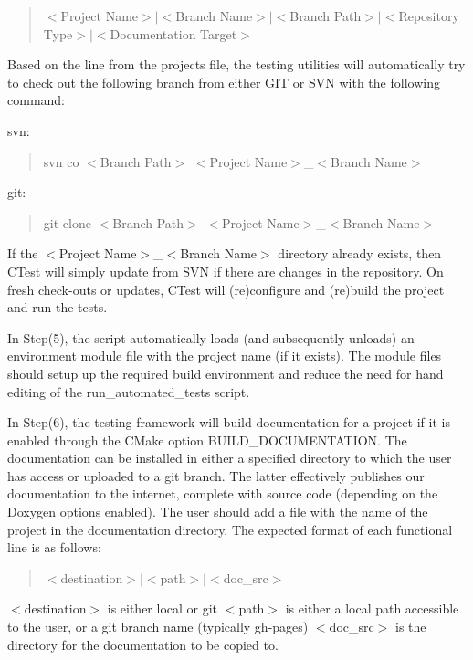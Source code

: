 \begin{quote}
$<$Project Name$>$$\vert$$<$Branch Name$>$$\vert$$<$Branch Path$>$$\vert$$<$Repository Type$>$$\vert$$<$Documentation Target$>$ \end{quote}


Based on the line from the projects file, the testing utilities will automatically try to check out the following branch from either G\+IT or S\+VN with the following command\+:

svn\+: \begin{quote}
{\ttfamily svn} {\ttfamily co} {\ttfamily $<$Branch} Path$>$ {\ttfamily $<$Project} Name$>$\+\_\+$<$Branch Name$>$ \end{quote}


git\+: \begin{quote}
{\ttfamily git} {\ttfamily clone} {\ttfamily $<$Branch} Path$>$ {\ttfamily $<$Project} Name$>$\+\_\+$<$Branch Name$>$ \end{quote}


If the $<$Project Name$>$\+\_\+$<$Branch Name$>$ directory already exists, then C\+Test will simply update from S\+VN if there are changes in the repository. On fresh check-\/outs or updates, C\+Test will (re)configure and (re)build the project and run the tests.

In Step(5), the script automatically loads (and subsequently unloads) an environment module file with the project name (if it exists). The module files should setup up the required build environment and reduce the need for hand editing of the run\+\_\+automated\+\_\+tests script.

In Step(6), the testing framework will build documentation for a project if it is enabled through the C\+Make option B\+U\+I\+L\+D\+\_\+\+D\+O\+C\+U\+M\+E\+N\+T\+A\+T\+I\+ON. The documentation can be installed in either a specified directory to which the user has access or uploaded to a git branch. The latter effectively publishes our documentation to the internet, complete with source code (depending on the Doxygen options enabled). The user should add a file with the name of the project in the documentation directory. The expected format of each functional line is as follows\+:

\begin{quote}
$<$destination$>$$\vert$$<$path$>$$\vert$$<$doc\+\_\+src$>$ \end{quote}


$<$destination$>$ is either local or git $<$path$>$ is either a local path accessible to the user, or a git branch name (typically gh-\/pages) $<$doc\+\_\+src$>$ is the directory for the documentation to be copied to.

